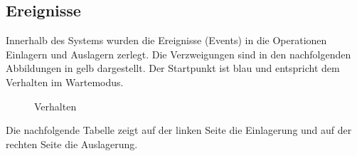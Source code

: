\subsection{Ereignisse}
Innerhalb des Systems wurden die Ereignisse (Events) in die Operationen Einlagern und Auslagern zerlegt. Die Verzweigungen sind in den nachfolgenden Abbildungen in gelb dargestellt. Der Startpunkt ist blau und entspricht dem Verhalten im Wartemodus. 
%
\begin{figure}[H]
\hfill
{}
\caption{Verhalten}
\end{figure}
%
Die nachfolgende Tabelle zeigt auf der linken Seite die Einlagerung und auf der rechten Seite die Auslagerung.
%
